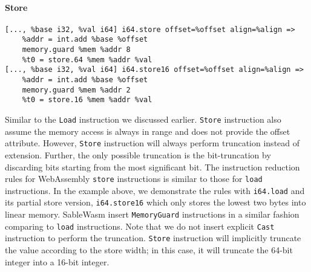 \paragraph{Store} \quad
\begin{lstlisting}[basicstyle=\linespread{0.8}\small, language=SableWasmMIR]
[..., %base i32, %val i64] i64.store offset=%offset align=%align =>
    %addr = int.add %base %offset
    memory.guard %mem %addr 8
    %t0 = store.64 %mem %addr %val
[..., %base i32, %val i64] i64.store16 offset=%offset align=%align =>
    %addr = int.add %base %offset
    memory.guard %mem %addr 2
    %t0 = store.16 %mem %addr %val
\end{lstlisting}
Similar to the \texttt{Load} instruction we discussed earlier. \texttt{Store} instruction also assume the memory access is always in range and does not provide the offset attribute. However, \texttt{Store} instruction will always perform truncation instead of extension. Further, the only possible truncation is the bit-truncation by discarding bits starting from the most significant bit. The instruction reduction rules for WebAssembly \texttt{store} instructions is similar to those for \texttt{load} instructions. In the example above, we demonstrate the rules with \texttt{i64.load} and its partial store version, \texttt{i64.store16} which only stores the lowest two bytes into linear memory. SableWasm insert \texttt{MemoryGuard} instructions in a similar fashion comparing to \texttt{load} instructions. Note that we do not insert explicit \texttt{Cast} instruction to perform the truncation. \texttt{Store} instruction will implicitly truncate the value according to the store width; in this case, it will truncate the 64-bit integer into a 16-bit integer.

